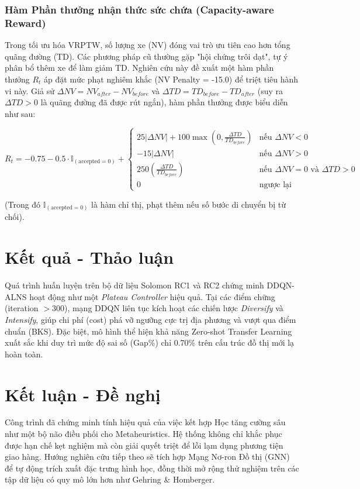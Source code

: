 \documentclass[13pt, a4paper]{extarticle} %
\begin{document}
\subsubsection{Hàm Phần thưởng nhận thức sức chứa (Capacity-aware Reward)}
Trong tối ưu hóa VRPTW, số lượng xe (NV) đóng vai trò ưu tiên cao hơn tổng quãng đường (TD). Các phương pháp cũ thường gặp "hội chứng trôi dạt", tự ý phân bổ thêm xe để làm giảm TD. Nghiên cứu này đề xuất một hàm phần thưởng $R_t$ áp đặt mức phạt nghiêm khắc (NV Penalty = -15.0) để triệt tiêu hành vi này. Giả sử $\Delta NV = NV_{after} - NV_{before}$ và $\Delta TD = TD_{before} - TD_{after}$ (suy ra $\Delta TD > 0$ là quãng đường đã được rút ngắn), hàm phần thưởng được biểu diễn như sau:

\[
R_t = -0.75 - 0.5 \cdot \mathbb{I}_{(\text{accepted} = 0)} + 
\begin{cases} 
25|\Delta NV| + 100 \max\left(0, \frac{\Delta TD}{TD_{before}}\right) & \text{nếu } \Delta NV < 0 \\ 
-15|\Delta NV| & \text{nếu } \Delta NV > 0 \\ 
250 \left(\frac{\Delta TD}{TD_{before}}\right) & \text{nếu } \Delta NV = 0 \text{ và } \Delta TD > 0 \\ 
0 & \text{ngược lại} 
\end{cases}
\]

(Trong đó $\mathbb{I}_{(\text{accepted} = 0)}$ là hàm chỉ thị, phạt thêm nếu số bước di chuyển bị từ chối).

\section{Kết quả - Thảo luận}
Quá trình huấn luyện trên bộ dữ liệu Solomon RC1 và RC2 chứng minh DDQN-ALNS hoạt động như một \textit{Plateau Controller} hiệu quả. Tại các điểm chững (iteration $> 300$), mạng DDQN liên tục kích hoạt các chiến lược \textit{Diversify} và \textit{Intensify}, giúp chi phí (cost) phá vỡ ngưỡng cực trị địa phương và vượt qua điểm chuẩn (BKS). Đặc biệt, mô hình thể hiện khả năng Zero-shot Transfer Learning xuất sắc khi duy trì mức độ sai số (Gap\%) chỉ 0.70\% trên cấu trúc đồ thị mới lạ hoàn toàn.

\section{Kết luận - Đề nghị}
Công trình đã chứng minh tính hiệu quả của việc kết hợp Học tăng cường sâu như một bộ não điều phối cho Metaheuristics. Hệ thống không chỉ khắc phục được hạn chế kẹt nghiệm mà còn giải quyết triệt để lỗi lạm dụng phương tiện giao hàng. Hướng nghiên cứu tiếp theo sẽ tích hợp Mạng Nơ-ron Đồ thị (GNN) để tự động trích xuất đặc trưng hình học, đồng thời mở rộng thử nghiệm trên các tập dữ liệu có quy mô lớn hơn như Gehring \& Homberger.
\end{document}
